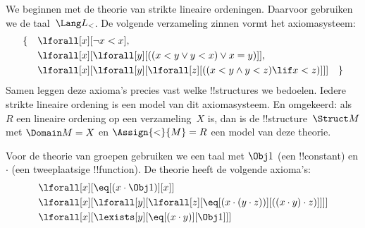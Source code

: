 \documentclass[../../../include/open-logic-section]{subfiles}
\begin{document}


\begin{ex}
We beginnen met de theorie van strikte lineaire ordeningen. Daarvoor
gebruiken we de taal~$\Lang L_<$. De volgende verzameling zinnen vormt
het axiomasysteem:
\begin{align*}
\{\quad & \lforall[x][\lnot x < x], \\
& \lforall[x][\lforall[y][((x < y \lor y <
    x) \lor x = y)]], \\
& \lforall[x][\lforall[y][\lforall[z][((x < y
      \land y < z) \lif x < z)]]] \quad \}
\end{align*}
Samen leggen deze axioma's precies vast welke !!{structure}s we
bedoelen. Iedere strikte lineaire ordening is een model van dit
axiomasysteem. En omgekeerd: als $R$ een lineaire ordening op een
verzameling~$X$ is, dan is de !!{structure}~$\Struct M$ met
$\Domain M = X$ en $\Assign{<}{M} = R$ een model van deze theorie.
\end{ex}

\begin{ex}
Voor de theorie van groepen gebruiken we een taal met $\Obj 1$ (een
!!{constant}) en $\cdot$ (een tweeplaatsige !!{function}). De theorie
heeft de volgende axioma's:
\begin{align*}
& \lforall[x][\eq[(x \cdot \Obj 1)][x]]\\
& \lforall[x][\lforall[y][\lforall[z][\eq[(x \cdot (y \cdot z))][((x
          \cdot y) \cdot z)]]]]\\
& \lforall[x][\lexists[y][\eq[(x \cdot y)][\Obj 1]]]
\end{align*}
\end{ex}
\end{document}
